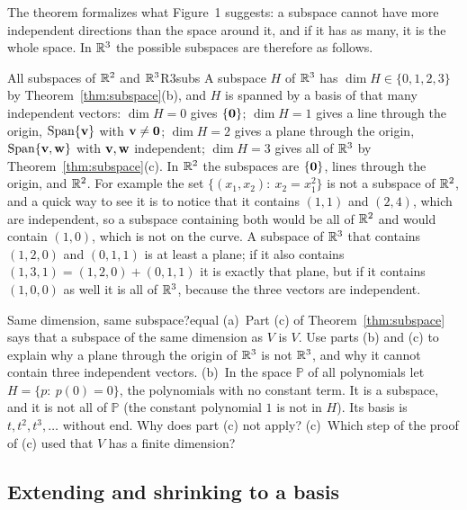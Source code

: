 \documentclass[11pt]{article}
\begin{document}
The theorem formalizes what Figure~1 suggests: a subspace cannot have more independent directions than the space around it, and if it has as many, it is the whole space. In $\mathbb{R}^3$ the possible subspaces are therefore as follows.

\begin{exmp}{All subspaces of $\mathbb{R}^2$ and $\mathbb{R}^3$}{R3subs}
A subspace $H$ of $\mathbb{R}^3$ has $\dim H\in\{0,1,2,3\}$ by Theorem~\ref{thm:subspace}(b), and $H$ is spanned by a basis of that many independent vectors: $\dim H=0$ gives $\{\mathbf{0}\}$; $\dim H=1$ gives a line through the origin, $\operatorname{Span}\{\mathbf{v}\}$ with $\mathbf{v}\ne\mathbf{0}$; $\dim H=2$ gives a plane through the origin, $\operatorname{Span}\{\mathbf{v},\mathbf{w}\}$ with $\mathbf{v},\mathbf{w}$ independent; $\dim H=3$ gives all of $\mathbb{R}^3$ by Theorem~\ref{thm:subspace}(c). In $\mathbb{R}^2$ the subspaces are $\{\mathbf{0}\}$, lines through the origin, and $\mathbb{R}^2$. For example the set $\{(x_1,x_2):\ x_2=x_1^2\}$ is not a subspace of $\mathbb{R}^2$, and a quick way to see it is to notice that it contains $(1,1)$ and $(2,4)$, which are independent, so a subspace containing both would be all of $\mathbb{R}^2$ and would contain $(1,0)$, which is not on the curve. A subspace of $\mathbb{R}^3$ that contains $(1,2,0)$ and $(0,1,1)$ is at least a plane; if it also contains $(1,3,1)=(1,2,0)+(0,1,1)$ it is exactly that plane, but if it contains $(1,0,0)$ as well it is all of $\mathbb{R}^3$, because the three vectors are independent.
\end{exmp}

\begin{think}{Same dimension, same subspace?}{equal}
(a)~Part (c) of Theorem~\ref{thm:subspace} says that a subspace of the same dimension as $V$ is $V$. Use parts (b) and (c) to explain why a plane through the origin of $\mathbb{R}^3$ is not $\mathbb{R}^3$, and why it cannot contain three independent vectors. (b)~In the space $\mathbb{P}$ of all polynomials let $H=\{p:\ p(0)=0\}$, the polynomials with no constant term. It is a subspace, and it is not all of $\mathbb{P}$ (the constant polynomial $1$ is not in $H$). Its basis is $t,t^2,t^3,\dots$ without end. Why does part (c) not apply? (c)~Which step of the proof of (c) used that $V$ has a finite dimension?
\end{think}

\subsection*{Extending and shrinking to a basis}
\end{document}
